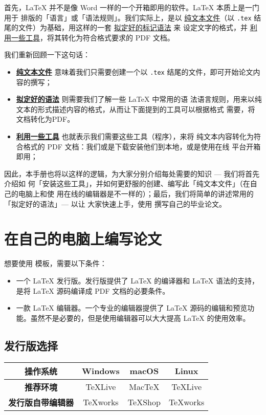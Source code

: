 首先，\LaTeX{} 并不是像 Word 一样的一个开箱即用的软件。\LaTeX{} 本质上是一门用于
排版的「语言」或「语法规则」。我们实际上，是以 \underline{纯文本文件}（以
\texttt{.tex} 结尾的文件）为基础，用这样的一套 \underline{拟定好的标记语法} 来
设定文字的格式，并 \underline{利用一些工具}，将其转化为符合格式要求的 PDF 文档。

我们重新回顾一下这句话：

\begin{itemize}[noitemsep]
  \item \textbf{\underline{纯文本文件}} 意味着我们只需要创建一个以 \texttt{.tex}
  结尾的文件，即可开始论文内容的撰写；
  \item \textbf{\underline{拟定好的语法}} 则需要我们了解一些 \LaTeX{} 中常用的语
  法语言规则，用来以纯文本的形式描述内容的格式，从而让下面提到的工具可以根据格式
  需要，将文档转化为PDF。
  \item \textbf{\underline{利用一些工具}} 也就表示我们需要这些工具（程序），来将
  纯文本内容转化为符合格式的 PDF 文档：我们或是下载安装他们到本地，或是使用在线
  平台开箱即用；
\end{itemize}

因此，本手册也将以这样的逻辑，为大家分别介绍每处需要的知识 --- 我们将首先介绍如
何「安装这些工具」，并如何更舒服的创建、编写此「纯文本文件」（在自己的电脑上和使
用在线的编辑器是不一样的）；最后，我们将简单的讲述常用的「拟定好的语法」--- 以让
大家快速上手，使用 \BIThesis{} 撰写自己的毕业论文。

\section{在自己的电脑上编写论文}

想要使用 \BIThesis{} 模板，需要以下条件：
\begin{itemize}
  \item 一个 \LaTeX{} 发行版。发行版提供了 \LaTeX{} 的编译器和 \LaTeX{} 语法的支持，是将 \LaTeX{} 源码编译成 PDF 文档的必要条件。
  \item 一款 \LaTeX{} 编辑器。一个专业的编辑器提供了 \LaTeX{} 源码的编辑和预览功能。虽然不是必要的，但是使用编辑器可以大大提高 \LaTeX{} 的使用效率。
\end{itemize}

\subsection{发行版选择}

\begin{table}[htbp]
  \centering
\begin{tabular}{@{}cccc@{}}
\toprule
\textbf{操作系统} & Windows & macOS  & Linux   \\ \midrule
\textbf{推荐环境} & TeXLive & MacTeX & TeXLive \\ \midrule
\textbf{发行版自带编辑器} & TeXworks & TeXShop & TeXworks \\ \bottomrule
\end{tabular}
\end{table}


